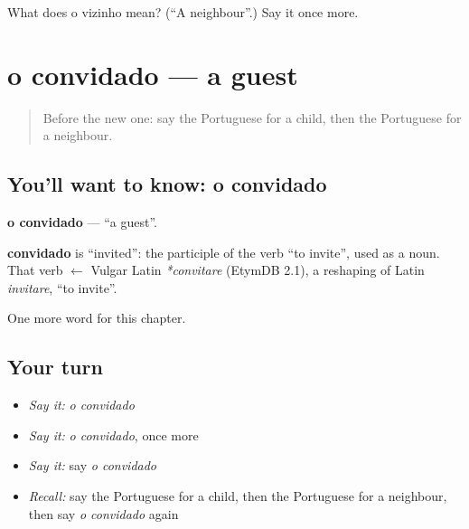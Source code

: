 \begin{tcolorbox}[breakable,colback=teal!4,colframe=teal!35!black,title={Before you move on}]
What does o vizinho mean? (\textquotedblleft{}A neighbour\textquotedblright{}.) Say it once more.
\end{tcolorbox}
\section[o convidado]{o convidado — a guest}

\label{lesson:PT-C39-convidado}



\begin{quote}
Before the new one: say the Portuguese for a child, then the Portuguese for a neighbour.
\end{quote}

\subsection*{You'll want to know: o convidado}
\textbf{o convidado} — \textquotedblleft{}a guest\textquotedblright{}.

\begin{cousinweb}
\textbf{convidado} is \textquotedblleft{}invited\textquotedblright{}: the participle of the verb \textquotedblleft{}to invite\textquotedblright{}, used as a noun. That verb $\leftarrow$ Vulgar Latin \emph{*convitare} (EtymDB 2.1), a reshaping of Latin \emph{invitare}, \textquotedblleft{}to invite\textquotedblright{}.
\end{cousinweb}

\begin{grammarlens}[title={What you've built}]
One more word for this chapter.
\end{grammarlens}

\subsection*{Your turn}
\begin{itemize}
\raggedright
  \item \emph{Say it:} \emph{o convidado}
  \item \emph{Say it:} \emph{o convidado}, once more
  \item \emph{Say it:} say \emph{o convidado}
  \item \emph{Recall:} say the Portuguese for a child, then the Portuguese for a neighbour, then say \emph{o convidado} again
\end{itemize}

